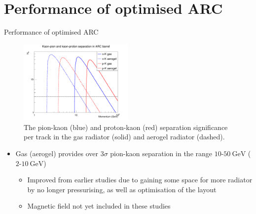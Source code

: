 \documentclass{beamer}
\begin{document}
\section{Performance of optimised ARC}
\begin{frame}{Performance of optimised ARC}
  \begin{figure}
    \centering
    \includegraphics[width = 0.5\textwidth]{Plots/Significance_Mean.png}
    \caption{The pion-kaon (blue) and proton-kaon (red) separation significance per track in the gas radiator (solid) and aerogel radiator (dashed).}
  \end{figure}
  \vspace{-0.5cm}
  \begin{itemize}
    \setlength\itemsep{1.0em}
    \item{Gas (aerogel) provides over $3\sigma$ pion-kaon separation in the range $10$-$\SI{50}{\giga\eV}$ ($2$-$\SI{10}{\giga\eV}$)}
    \begin{itemize}
      \item{Improved from earlier studies due to gaining some space for more radiator by no longer pressurising, as well as optimisation of the layout}
      \item{Magnetic field not yet included in these studies}
    \end{itemize}
  \end{itemize}
\end{frame}
\end{document}
